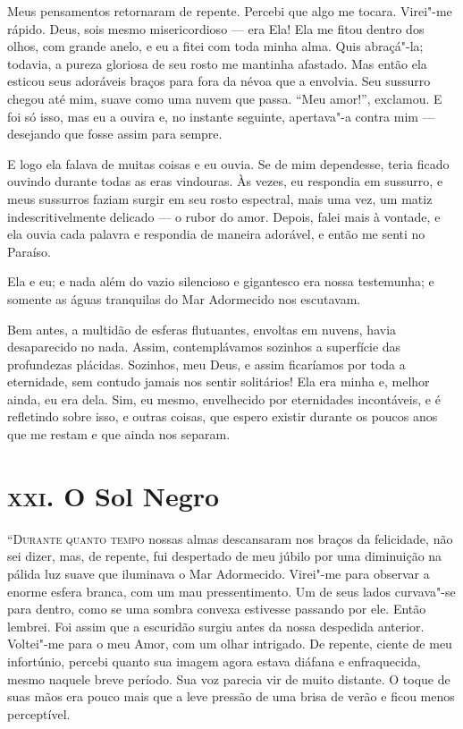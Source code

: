 Meus pensamentos retornaram de repente. Percebi que algo me tocara. Virei"-me rápido. Deus, sois mesmo
misericordioso --- era Ela! Ela me fitou dentro dos olhos, com grande anelo, e eu a fitei com toda minha alma. Quis
abraçá"-la; todavia, a pureza gloriosa de seu rosto me mantinha afastado. Mas então ela esticou seus adoráveis braços
para fora da névoa que a envolvia. Seu sussurro chegou até mim, suave como uma nuvem que passa. “Meu amor!”, exclamou.
E foi só isso, mas eu a ouvira e, no instante seguinte, apertava"-a contra mim --- desejando que fosse assim para sempre.

E logo ela falava de muitas coisas e eu ouvia. Se de mim dependesse, teria ficado ouvindo durante todas as eras
vindouras. Às vezes, eu respondia em sussurro, e meus sussurros faziam surgir em seu rosto espectral, mais uma vez, um
matiz indescritivelmente delicado --- o rubor do amor. Depois, falei mais à vontade, e ela ouvia cada palavra e respondia
de maneira adorável, e então me senti no Paraíso.

Ela e eu; e nada além do vazio silencioso e gigantesco era nossa testemunha; e somente as águas tranquilas do Mar
Adormecido nos escutavam.

Bem antes, a multidão de esferas flutuantes, envoltas em nuvens, havia desaparecido no nada. Assim, contemplávamos
sozinhos a superfície das profundezas plácidas. Sozinhos, meu Deus, e assim ficaríamos por toda a eternidade, sem
contudo jamais nos sentir solitários! Ela era minha e, melhor ainda, eu era dela. Sim, eu mesmo, envelhecido por
eternidades incontáveis, e é refletindo sobre isso, e outras coisas, que espero existir durante os poucos anos que me
restam e que ainda nos separam.


\clearpage

\chapter{\textsc{xxi}. O Sol Negro}

\textsc{“Durante quanto tempo} nossas almas descansaram nos braços da felicidade, não sei dizer, mas, de repente, fui despertado
de meu júbilo por uma diminuição na pálida luz suave que iluminava o Mar Adormecido. Virei"-me para observar a enorme
esfera branca, com um mau pressentimento. Um de seus lados curvava"-se para dentro, como se uma sombra convexa estivesse
passando por ele. Então lembrei. Foi assim que a escuridão surgiu antes da nossa despedida anterior. Voltei"-me para o
meu Amor, com um olhar intrigado. De repente, ciente de meu infortúnio, percebi quanto sua imagem agora estava
diáfana e enfraquecida, mesmo naquele breve período. Sua voz parecia vir de muito distante. O toque de suas mãos era
pouco mais que a leve pressão de uma brisa de verão e ficou menos perceptível.

